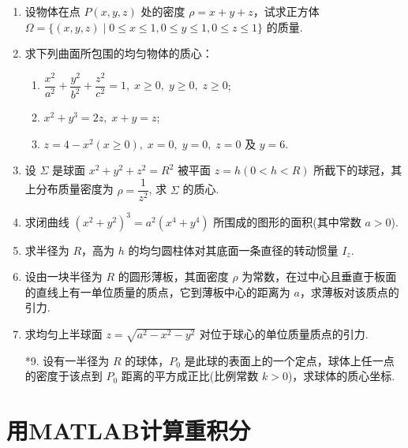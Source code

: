 \begin{enumerate}\setlength{\itemsep}{7pt}
    \item 设物体在点 $P(x, y, z)$ 处的密度 $\rho=x+y+z$，试求正方体 $\Omega=\{(x, y, z) \mid 0\leqslant x\leqslant 1,0\leqslant y\leqslant 1,0\leqslant z\leqslant 1\}$ 的质量.
    
    \item 求下列曲面所包围的均匀物体的质心：
    \begin{enumerate}[(1)]\setlength{\itemsep}{5pt}\setlength{\topsep}{15pt}
        \item $\dfrac{x^2}{a^2}+\dfrac{y^2}{b^2}+\dfrac{z^2}{c^2}=1,\;x\geqslant0,\;y\geqslant0,\;z\geqslant0$;
        \item $x^2+y^3=2z,\;x+y=z$;
        \item $z=4-x^2(x\geqslant0),\;x=0,\;y=0,\;z=0$ 及 $y=6$.
    \end{enumerate}

    \item 设 $\Sigma$ 是球面 $x^2+y^2+z^2=R^2$ 被平面 $z=h(0<h<R)$ 所截下的球冠，其上分布质量密度为 $\rho=\dfrac{1}{z^2}$, 求 $\Sigma$ 的质心.

    \item 求闭曲线 $(x^2+y^2)^3=a^2(x^4+y^4)$ 所围成的图形的面积(其中常数 $a>0$).
    
    \item 求半径为 $R$，高为 $h$ 的均匀圆柱体对其底面一条直径的转动惯量 $I_z$.
    
    \item 设由一块半径为 $R$ 的圆形薄板，其面密度 $\rho$ 为常数，在过中心且垂直于板面的直线上有一单位质量的质点，它到薄板中心的距离为 $a$，求薄板对该质点的引力.
    
    \item 求均匀上半球面 $z=\sqrt{a^2-x^2-y^2}$ 对位于球心的单位质量质点的引力.
    
    \item[*9.] 设有一半径为 $R$ 的球体，$P_0$ 是此球的表面上的一个定点，球体上任一点的密度于该点到 $P_0$ 距离的平方成正比(比例常数 $k>0$)，求球体的质心坐标. 
\end{enumerate}


\section{用MATLAB计算重积分}

